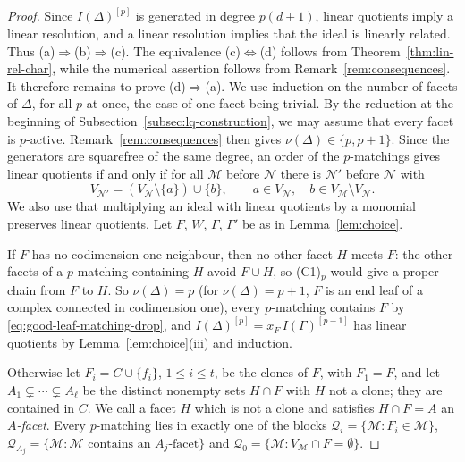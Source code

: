 \documentclass{amsart}
\theoremstyle{definition}
\theoremstyle{remark}
\begin{document}
\begin{proof}
Since $I(\Delta)^{[p]}$ is generated in degree $p(d+1)$, linear quotients imply a linear resolution, and a linear resolution implies that the ideal is linearly related. Thus (a)$\Rightarrow$(b)$\Rightarrow$(c). The equivalence (c)$\Leftrightarrow$(d) follows from Theorem~\ref{thm:lin-rel-char}, while the numerical assertion follows from Remark~\ref{rem:consequences}. It therefore remains to prove (d)$\Rightarrow$(a). We use induction on the number of facets of $\Delta$, for all $p$ at once, the case of one facet being trivial. By the reduction at the beginning of
Subsection~\ref{subsec:lq-construction}, we may assume that every facet
is $p$-active. Remark~\ref{rem:consequences} then gives
$\nu(\Delta)\in\{p,p+1\}$. Since the generators are squarefree of the same degree, an order of the $p$-matchings gives linear quotients if and only if for all $\mathcal M$ before $\mathcal N$ there is $\mathcal N'$ before $\mathcal N$ with
\begin{equation}\label{eq:lq}
V_{\mathcal N'}=(V_{\mathcal N}\setminus\{a\})\cup\{b\},
\qquad a\in V_{\mathcal N},\quad
b\in V_{\mathcal M}\setminus V_{\mathcal N}.
\end{equation}
We also use that multiplying an ideal with linear quotients by a monomial preserves linear quotients. Let $F$, $W$, $\Gamma$, $\Gamma'$ be as in Lemma~\ref{lem:choice}.

If $F$ has no codimension one neighbour, then no other facet $H$ meets $F$: the other facets of a $p$-matching containing $H$ avoid $F\cup H$, so (C1)$_p$ would give a proper chain from $F$ to $H$. So $\nu(\Delta)=p$ (for $\nu(\Delta)=p+1$, $F$ is an end leaf of a complex connected in codimension one), every $p$-matching contains $F$ by \eqref{eq:good-leaf-matching-drop}, and $I(\Delta)^{[p]}=x_F\,I(\Gamma)^{[p-1]}$ has linear quotients by Lemma~\ref{lem:choice}(iii) and induction.

Otherwise let $F_i=C\cup\{f_i\}$, $1\leq i\leq t$, be the clones of $F$, with $F_1=F$, and let $A_1\subsetneq\cdots\subsetneq A_\ell$ be the distinct nonempty sets $H\cap F$ with $H$ not a clone; they are contained in $C$. We call a facet $H$ which is not a clone and satisfies $H\cap F=A$ an \emph{$A$-facet}. Every $p$-matching lies in exactly one of the blocks $\mathcal Q_i=\{\mathcal M:F_i\in\mathcal M\}$, $\mathcal Q_{A_j}=\{\mathcal M:\mathcal M\text{ contains an }A_j\text{-facet}\}$ and $\mathcal Q_0=\{\mathcal M:V_{\mathcal M}\cap F=\emptyset\}$.


\end{proof}
\end{document}
